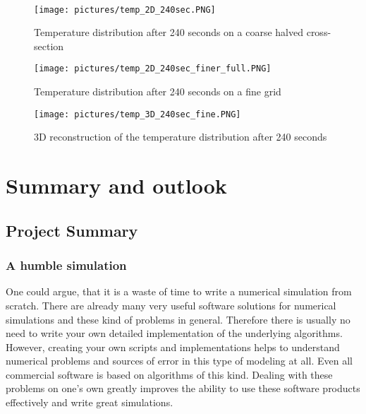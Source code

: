 \documentclass[parskip=half, titlepage=yes, 12pt, BCOR=12mm, DIV=calc]{scrartcl}
\begin{document}
\\

\begin{figure}[H]
    \centering
    \texttt{[image: pictures/temp\_2D\_240sec.PNG]}
    \caption{Temperature distribution after 240 seconds on a coarse halved cross-section}
    \label{temp_2D_240sec}
\end{figure}


\begin{figure}[H]
    \centering
    \texttt{[image: pictures/temp\_2D\_240sec\_finer\_full.PNG]}
    \caption{Temperature distribution after 240 seconds on a fine grid}
    \label{temp_2D_240sec_finer_full}
\end{figure}


\begin{figure}[H]
    \centering
    \texttt{[image: pictures/temp\_3D\_240sec\_fine.PNG]}
    \caption{3D reconstruction of the temperature distribution after 240 seconds}
    \label{temp_3D_240sec_fine}
\end{figure}




\section{Summary and outlook}

\subsection{Project Summary}
\subsubsection{A humble simulation}
One could argue, that it is a waste of time to write a numerical simulation from scratch. There are already many very useful software solutions for numerical simulations and these kind of problems in general. Therefore there is usually no need to write your own detailed implementation of the underlying algorithms. \\

However, creating your own scripts and implementations helps to understand numerical problems and sources of error in this type of modeling at all. Even all commercial software is based on algorithms of this kind. Dealing with these problems on one's own greatly improves the ability to use these software products effectively and write great simulations.\\
\end{document}
